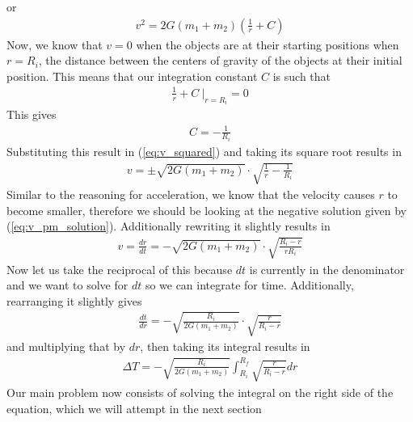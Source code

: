 \documentclass{article}
\begin{document}
or 
\begin{align}
    \label{eq:v_squared}
    v^2 = 2G (m_1 + m_2) (\frac{1}{r} + C)
\end{align}
Now, we know that $v=0$ when the objects are at their starting positions when $r=R_i$, the distance between the centers of gravity of the objects at their initial position. This means that our integration constant $C$ is such that
\begin{align}
    \frac{1}{r} + C ~ \bigg|_{r=R_i} = 0
\end{align}
This gives
\begin{align}
    C = -\frac{1}{R_i}
\end{align}
Substituting this result in (\ref{eq:v_squared}) and taking its square root results in
\begin{align}
    \label{eq:v_pm_solution}
    v = \pm \sqrt{2G (m_1 + m_2)}  \cdot \sqrt{\frac{1}{r} - \frac{1}{R_i}}
\end{align}
Similar to the reasoning for acceleration, we know that the velocity causes $r$ to become smaller, therefore we should be looking at the negative solution given by (\ref{eq:v_pm_solution}). Additionally rewriting it slightly results in
\begin{align}
    v = \frac{dr}{dt} = - \sqrt{2G(m_1 + m_2)} \cdot \sqrt{\frac{R_i - r}{ rR_i}}
\end{align}
Now let us take the reciprocal of this because $dt$ is currently in the denominator and we want to solve for $dt$ so we can integrate for time. Additionally, rearranging it slightly gives
\begin{align}
    \frac{dt}{dr} = - \sqrt{\frac{R_i}{2G(m_1 + m_2)}} \cdot \sqrt{\frac{r}{R_i - r}}
\end{align}
and multiplying that by $dr$, then taking its integral results in
\begin{align}
    \label{eq:primary_solution}
    \Delta T =  - \sqrt{\frac{R_i}{2G(m_1 + m_2)}} \int_{R_i}^{R_f} \sqrt{\frac{r}{R_i - r}} dr
\end{align}
Our main problem now consists of solving the integral on the right side of the equation, which we will attempt in the next section
\end{document}
